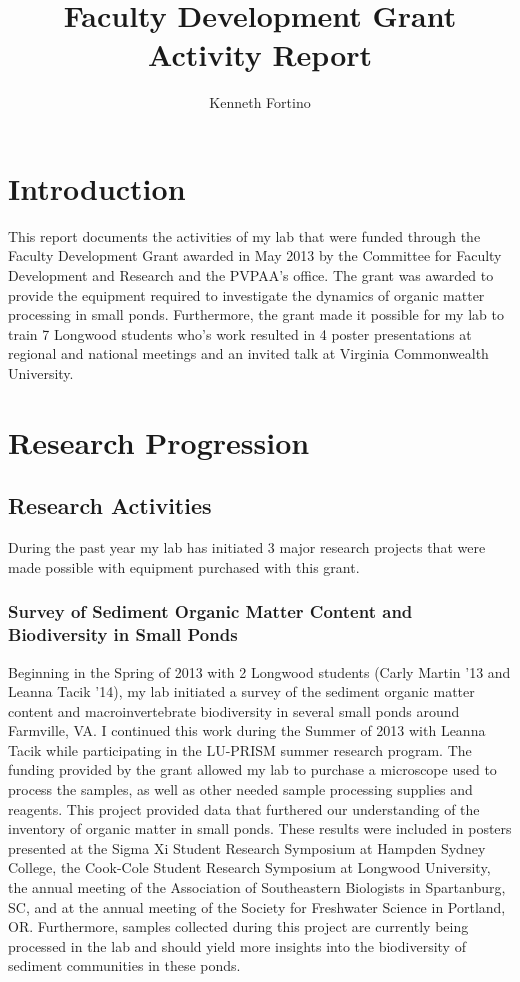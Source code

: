 \documentclass{article}
\title{Faculty Development Grant Activity Report}
\author{Kenneth Fortino}
\begin{document}
\maketitle


\section{Introduction}

This report documents the activities of my lab that were funded through the Faculty Development Grant awarded in May 2013 by the Committee for Faculty Development and Research and the PVPAA's office. The grant was awarded to provide the equipment required to investigate the dynamics of organic matter processing in small ponds.  Furthermore, the grant made it possible for my lab to train 7 Longwood students who's work resulted in 4 poster presentations at regional and national meetings and an invited talk at Virginia Commonwealth University.



\section{Research Progression}
\subsection{Research Activities}
During the past year my lab has initiated 3 major research projects that were made possible with equipment purchased with this grant.
\subsubsection{Survey of Sediment Organic Matter Content and Biodiversity in Small Ponds}
Beginning in the Spring of 2013 with 2 Longwood students (Carly Martin '13 and Leanna Tacik '14), my lab initiated a survey of the sediment organic matter content and macroinvertebrate biodiversity in several small ponds around Farmville, VA. I continued this work during the Summer of 2013 with Leanna Tacik while participating in the LU-PRISM summer research program. The funding provided by the grant allowed my lab to purchase a microscope used to process the samples, as well as other needed sample processing supplies and reagents. This project provided data that furthered our understanding of the inventory of organic matter in small ponds. These results were included in posters presented at the Sigma Xi Student Research Symposium at Hampden Sydney College, the Cook-Cole Student Research Symposium at Longwood University, the annual meeting of the Association of Southeastern Biologists in Spartanburg, SC, and at the annual meeting of the Society for Freshwater Science in Portland, OR. Furthermore, samples collected during this project are currently being processed in the lab and should yield more insights into the biodiversity of sediment communities in these ponds.
\end{document}
